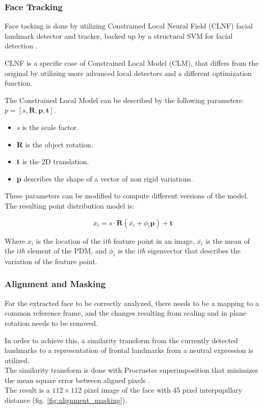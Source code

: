 \subsubsection{Face Tracking}
Face tacking is done by utilizing Constrained Local Neural Field (CLNF) facial landmark detector and tracker, backed up by a structural SVM for facial detection \cite{Baltru2013}.

CLNF is a specific case of Constrained Local Model (CLM), that differs from the original by utilizing more advanced local detectors and a different optimization function.

The Constrained Local Model can be described by the following parameters: \\
$p = [s, \mathbf{R}, \mathbf{p}, \mathbf{t}]$.
\begin{itemize}[noitemsep, topsep = -5pt]
	\item \textit{s} is the scale factor.
	\item \textbf{R} is the object rotation.
	\item \textbf{t} is the 2D translation.
	\item \textbf{p} describes the shape of a vector of non rigid variations.
\end{itemize}

These parameters can be modified to compute different versions of the model. The resulting point distribution model is:

\begin{equation} \label{eq:pdm}
	x_i = s \cdot \mathbf{R}(\overline{x_i} + \phi_i \mathbf{p}) + \mathbf{t}
\end{equation}

Where $x_i$ is the location of the i\textit{th} feature point in an image, $\overline{x_i}$ is the mean of the i\textit{th} element of the PDM, and $\phi_i$ is the i\textit{th} eigenvector that describes the variation of the feature point.

\subsubsection{Alignment and Masking}
For the extracted face to be correctly analyzed, there needs to be a mapping to a common reference frame, and the changes resulting from scaling and in plane rotation needs to be removed. 

In order to achieve this, a similarity transform from the currently detected landmarks to a representation of frontal landmarks from a neutral expression is utilized. \\
The similarity transform is done with Procrustes superimposition that minimizes the mean square error between aligned pixels \cite{Baltru2013}.\\
The result is a $112 \times 112$ pixel image of the face with 45 pixel interpupillary distance (fig. \ref{fig:alignment_masking}). 

